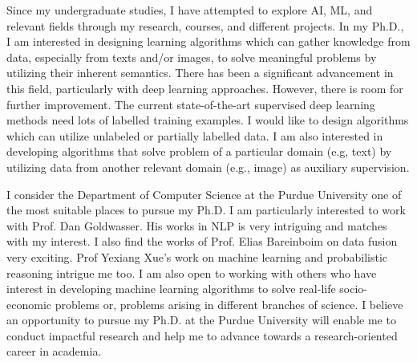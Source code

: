 \documentclass[12pt]{article}
\begin{document}
Since my undergraduate studies, I have attempted to explore AI, ML, and relevant fields through my research, courses, and different projects. In my Ph.D., I am interested in designing learning algorithms which can gather knowledge from data, especially from texts and/or images, to solve meaningful problems by utilizing their inherent semantics. There has been a significant advancement in this field, particularly with deep learning approaches. However, there is room for further improvement. The current state-of-the-art supervised deep learning methods need lots of labelled training examples. I would like to design algorithms which can utilize unlabeled or partially labelled data. I am also interested in developing algorithms that solve problem of a particular domain (e.g, text) by utilizing data from another relevant domain (e.g., image) as auxiliary supervision.


I consider the Department of Computer Science at the Purdue University one of the most suitable places to pursue my Ph.D. I am particularly interested to work with Prof. Dan Goldwasser. His works in NLP is very intriguing and matches with my interest. I also find the works of Prof. Elias Bareinboim on data fusion very exciting.  Prof Yexiang Xue's work on machine learning and probabilistic reasoning  intrigue me too. I am also open to working with others who have interest in developing machine learning algorithms to solve real-life socio-economic problems or, problems arising in different branches of science. I believe an opportunity to pursue my Ph.D. at the Purdue University will enable me to conduct impactful research and help me to advance towards a research-oriented career in academia.


\end{document}
